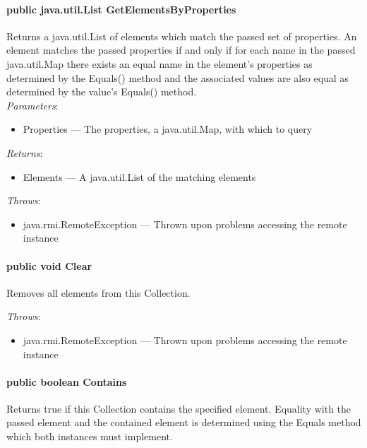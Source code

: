 \documentclass[$Date: 2003/06/26 19:29:31 $]{glabarticle}
\begin{document}
\paragraph{public java.util.List GetElementsByProperties}

Returns a java.util.List of elements which match the passed set of
properties. An element matches the passed properties if and only if
for each name in the passed java.util.Map there exists an equal name in
the element's properties as determined by the Equals() method and the
associated values are also equal as determined by the value's Equals()
method.\\

\textit{Parameters}:
\begin{itemize}
\item[] Properties --- The properties, a java.util.Map, with which to query 
\end{itemize}

\textit{Returns}:
\begin{itemize}
\item[] Elements --- A java.util.List of the matching elements 
\end{itemize}

 \textit{Throws}:
 \begin{itemize}
 \item[] java.rmi.RemoteException --- Thrown upon problems accessing the remote instance 
 \end{itemize}

\paragraph{public void Clear}

Removes all elements from this Collection.

 \textit{Throws}:
 \begin{itemize}
 \item[] java.rmi.RemoteException --- Thrown upon problems accessing the remote instance 
 \end{itemize}

\paragraph{public boolean Contains}

Returns true if this Collection contains the specified
element. Equality with the passed element and the contained element is
determined using the Equals method which both instances must
implement.\\
\end{document}
